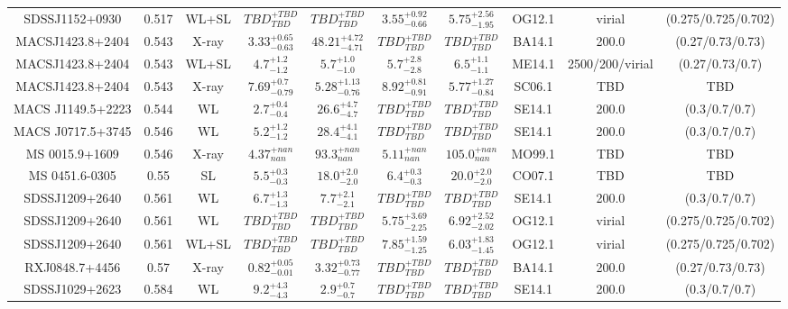 \begin{table}
\begin{tabular}{cccccccccc}
SDSSJ1152+0930 & 0.517 & WL+SL & ${TBD}^{+TBD}_{TBD}$ & ${TBD}^{+TBD}_{TBD}$ & ${3.55}^{+0.92}_{-0.66}$ & ${5.75}^{+2.56}_{-1.95}$ & OG12.1 & virial & (0.275/0.725/0.702) \\
MACSJ1423.8+2404 & 0.543 & X-ray & ${3.33}^{+0.65}_{-0.63}$ & ${48.21}^{+4.72}_{-4.71}$ & ${TBD}^{+TBD}_{TBD}$ & ${TBD}^{+TBD}_{TBD}$ & BA14.1 & 200.0 & (0.27/0.73/0.73) \\
MACSJ1423.8+2404 & 0.543 & WL+SL & ${4.7}^{+1.2}_{-1.2}$ & ${5.7}^{+1.0}_{-1.0}$ & ${5.7}^{+2.8}_{-2.8}$ & ${6.5}^{+1.1}_{-1.1}$ & ME14.1 & 2500/200/virial & (0.27/0.73/0.7) \\
MACSJ1423.8+2404 & 0.543 & X-ray & ${7.69}^{+0.7}_{-0.79}$ & ${5.28}^{+1.13}_{-0.76}$ & ${8.92}^{+0.81}_{-0.91}$ & ${5.77}^{+1.27}_{-0.84}$ & SC06.1 & TBD & TBD \\
MACS J1149.5+2223 & 0.544 & WL & ${2.7}^{+0.4}_{-0.4}$ & ${26.6}^{+4.7}_{-4.7}$ & ${TBD}^{+TBD}_{TBD}$ & ${TBD}^{+TBD}_{TBD}$ & SE14.1 & 200.0 & (0.3/0.7/0.7) \\
MACS J0717.5+3745 & 0.546 & WL & ${5.2}^{+1.2}_{-1.2}$ & ${28.4}^{+4.1}_{-4.1}$ & ${TBD}^{+TBD}_{TBD}$ & ${TBD}^{+TBD}_{TBD}$ & SE14.1 & 200.0 & (0.3/0.7/0.7) \\
MS 0015.9+1609 & 0.546 & X-ray & ${4.37}^{+nan}_{nan}$ & ${93.3}^{+nan}_{nan}$ & ${5.11}^{+nan}_{nan}$ & ${105.0}^{+nan}_{nan}$ & MO99.1 & TBD & TBD \\
MS 0451.6-0305 & 0.55 & SL & ${5.5}^{+0.3}_{-0.3}$ & ${18.0}^{+2.0}_{-2.0}$ & ${6.4}^{+0.3}_{-0.3}$ & ${20.0}^{+2.0}_{-2.0}$ & CO07.1 & TBD & TBD \\
SDSSJ1209+2640 & 0.561 & WL & ${6.7}^{+1.3}_{-1.3}$ & ${7.7}^{+2.1}_{-2.1}$ & ${TBD}^{+TBD}_{TBD}$ & ${TBD}^{+TBD}_{TBD}$ & SE14.1 & 200.0 & (0.3/0.7/0.7) \\
SDSSJ1209+2640 & 0.561 & WL & ${TBD}^{+TBD}_{TBD}$ & ${TBD}^{+TBD}_{TBD}$ & ${5.75}^{+3.69}_{-2.25}$ & ${6.92}^{+2.52}_{-2.02}$ & OG12.1 & virial & (0.275/0.725/0.702) \\
SDSSJ1209+2640 & 0.561 & WL+SL & ${TBD}^{+TBD}_{TBD}$ & ${TBD}^{+TBD}_{TBD}$ & ${7.85}^{+1.59}_{-1.25}$ & ${6.03}^{+1.83}_{-1.45}$ & OG12.1 & virial & (0.275/0.725/0.702) \\
RXJ0848.7+4456 & 0.57 & X-ray & ${0.82}^{+0.05}_{-0.01}$ & ${3.32}^{+0.73}_{-0.77}$ & ${TBD}^{+TBD}_{TBD}$ & ${TBD}^{+TBD}_{TBD}$ & BA14.1 & 200.0 & (0.27/0.73/0.73) \\
SDSSJ1029+2623 & 0.584 & WL & ${9.2}^{+4.3}_{-4.3}$ & ${2.9}^{+0.7}_{-0.7}$ & ${TBD}^{+TBD}_{TBD}$ & ${TBD}^{+TBD}_{TBD}$ & SE14.1 & 200.0 & (0.3/0.7/0.7) \\

\end{tabular}
\end{table}
